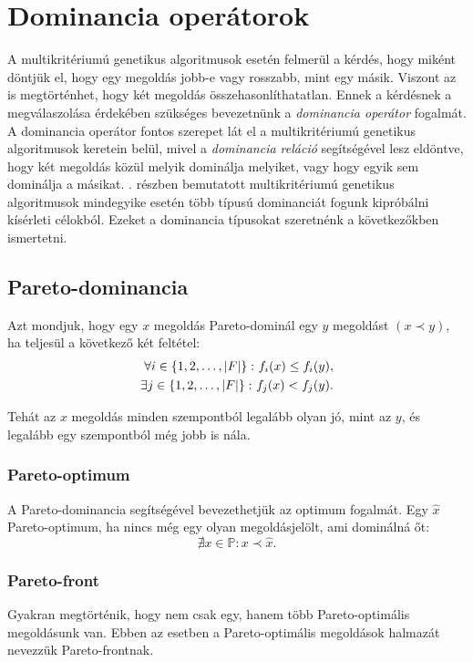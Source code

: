 \section{Dominancia operátorok}
A multikritériumú genetikus algoritmusok esetén felmerül a kérdés, hogy miként döntjük el, hogy egy megoldás jobb-e vagy rosszabb, mint egy másik.
Viszont az is megtörténhet, hogy két megoldás összehasonlíthatatlan.
Ennek a kérdésnek a megválaszolása érdekében szükséges bevezetnünk a \textit{dominancia operátor} fogalmát.
A dominancia operátor fontos szerepet lát el a multikritériumú genetikus algoritmusok keretein belül,
mivel a \textit{dominancia reláció} segítségével lesz eldöntve, hogy két megoldás közül melyik dominálja melyiket, vagy hogy egyik sem dominálja a másikat.
. részben bemutatott multikritériumú genetikus algoritmusok mindegyike esetén több típusú dominanciát fogunk kipróbálni kísérleti célokból.
Ezeket a dominancia típusokat szeretnénk a következőkben ismertetni.


\subsection{Pareto-dominancia}
Azt mondjuk, hogy egy $x$ megoldás Pareto-dominál egy $y$ megoldást $\left( x \prec y \right)$, ha teljesül a következő két feltétel:
\begin{align*}
  \forall i \in \left\{ 1, 2, \dots, \lvert F\rvert \right\} \colon f_i(x) \leq f_i(y), \\
  \exists j \in \left\{ 1, 2, \dots, \lvert F\rvert \right\} \colon f_j(x) < f_j(y).
\end{align*}

Tehát az $x$ megoldás minden szempontból legalább olyan jó, mint az $y$, és legalább egy szempontból még jobb is nála.


\subsubsection{Pareto-optimum}
A Pareto-dominancia segítségével bevezethetjük az optimum fogalmát.
Egy $\hat{x}$ Pareto-optimum, ha nincs még egy olyan megoldásjelölt, ami dominálná őt:
\[
  \nexists x \in \mathbb{P} \colon x \prec \hat{x}.
\]


\subsubsection{Pareto-front}
Gyakran megtörténik, hogy nem csak egy, hanem több Pareto-optimális megoldásunk van.
Ebben az esetben a Pareto-optimális megoldások halmazát nevezzük Pareto-frontnak.


